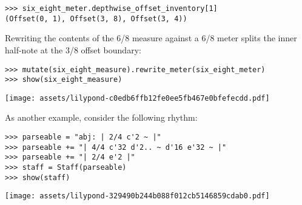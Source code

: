 \begin{comment}
<abjad>
six_eight_meter.depthwise_offset_inventory[1]
</abjad>
\end{comment}

\begin{abjadbookoutput}
\begin{singlespacing}
\vspace{-0.5\baselineskip}
\begin{lstlisting}
>>> six_eight_meter.depthwise_offset_inventory[1]
(Offset(0, 1), Offset(3, 8), Offset(3, 4))
\end{lstlisting}
\end{singlespacing}
\end{abjadbookoutput}

\noindent Rewriting the contents of the 6/8 measure against a 6/8 meter splits
the inner half-note at the 3/8 offset boundary:

\begin{comment}
<abjad>
mutate(six_eight_measure).rewrite_meter(six_eight_meter)
show(six_eight_measure)
</abjad>
\end{comment}

\begin{abjadbookoutput}
\begin{singlespacing}
\vspace{-0.5\baselineskip}
\begin{lstlisting}
>>> mutate(six_eight_measure).rewrite_meter(six_eight_meter)
>>> show(six_eight_measure)
\end{lstlisting}
\noindent\texttt{[image: assets/lilypond-c0edb6ffb12fe0ee5fb467e0bfefecdd.pdf]}
\end{singlespacing}
\end{abjadbookoutput}

\noindent As another example, consider the following rhythm:

\begin{comment}
<abjad>
parseable = "abj: | 2/4 c'2 ~ |"
parseable += "| 4/4 c'32 d'2.. ~ d'16 e'32 ~ |"
parseable += "| 2/4 e'2 |"
staff = Staff(parseable)
show(staff)
</abjad>
\end{comment}

\begin{abjadbookoutput}
\begin{singlespacing}
\vspace{-0.5\baselineskip}
\begin{lstlisting}
>>> parseable = "abj: | 2/4 c'2 ~ |"
>>> parseable += "| 4/4 c'32 d'2.. ~ d'16 e'32 ~ |"
>>> parseable += "| 2/4 e'2 |"
>>> staff = Staff(parseable)
>>> show(staff)
\end{lstlisting}
\noindent\texttt{[image: assets/lilypond-329490b244b088f012cb5146859cdab0.pdf]}
\end{singlespacing}
\end{abjadbookoutput}

